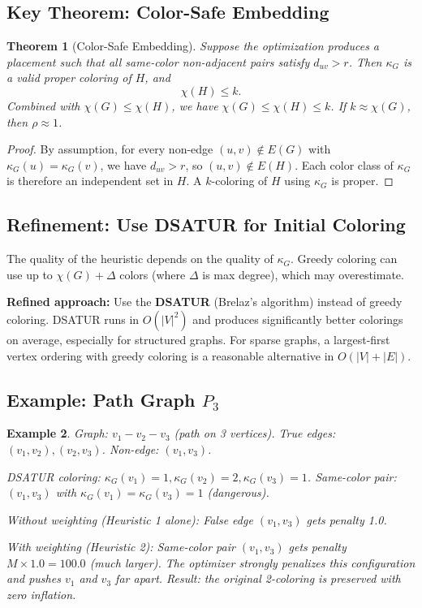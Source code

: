 \documentclass[11pt]{article}
\newtheorem{theorem}{Theorem}[section]
\newtheorem{example}[theorem]{Example}
\begin{document}
\subsection{Key Theorem: Color-Safe Embedding}

\begin{theorem}[Color-Safe Embedding]
\label{thm:colorsafe}
Suppose the optimization produces a placement such that all same-color non-adjacent
pairs satisfy $d_{uv} > r$. Then $\kappa_G$ is a valid proper coloring of $H$, and
\[
  \chi(H) \leq k.
\]
Combined with $\chi(G) \leq \chi(H)$, we have $\chi(G) \leq \chi(H) \leq k$.
If $k \approx \chi(G)$, then $\rho \approx 1$.
\end{theorem}

\begin{proof}
By assumption, for every non-edge $(u,v) \notin E(G)$ with $\kappa_G(u) =
\kappa_G(v)$, we have $d_{uv} > r$, so $(u,v) \notin E(H)$.  Each color
class of $\kappa_G$ is therefore an independent set in $H$.  A $k$-coloring
of $H$ using $\kappa_G$ is proper.
\end{proof}

\subsection{Refinement: Use DSATUR for Initial Coloring}

The quality of the heuristic depends on the quality of $\kappa_G$.  Greedy coloring
can use up to $\chi(G) + \Delta$ colors (where $\Delta$ is max degree),
which may overestimate.

\textbf{Refined approach:} Use the \textbf{DSATUR} (Brelaz's algorithm) \cite{Brelaz1979}
instead of greedy coloring. DSATUR runs in $O(|V|^2)$ and produces
significantly better colorings on average, especially for structured graphs.
For sparse graphs, a largest-first vertex ordering with greedy coloring \cite{Welsh1967}
is a reasonable alternative in $O(|V| + |E|)$.

\subsection{Example: Path Graph $P_3$}

\begin{example}
Graph: $v_1 - v_2 - v_3$ (path on 3 vertices).  True edges: $(v_1,v_2), (v_2,v_3)$.
Non-edge: $(v_1,v_3)$.

DSATUR coloring: $\kappa_G(v_1) = 1, \kappa_G(v_2) = 2, \kappa_G(v_3) = 1$.
Same-color pair: $(v_1, v_3)$ with $\kappa_G(v_1) = \kappa_G(v_3) = 1$ (dangerous).

Without weighting (Heuristic 1 alone): False edge $(v_1, v_3)$ gets penalty 1.0.

With weighting (Heuristic 2): Same-color pair $(v_1, v_3)$ gets penalty $M \times 1.0 = 100.0$
(much larger). The optimizer strongly penalizes this configuration and pushes
$v_1$ and $v_3$ far apart. Result: the original 2-coloring is preserved with
zero inflation.
\end{example}
\end{document}
